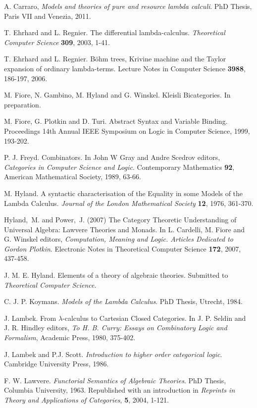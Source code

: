 \documentclass[12pt, amstex, amssymb]{article}
\begin{document}
\begin{thebibliography}{length}
A. Carraro, {\em Models and theories of pure and 
resource lambda calculi}.
PhD Thesis, Paris VII and Venezia, 2011.

T. Ehrhard and L. Regnier. The differential lambda-calculus.
{\em Theoretical Computer Science} {\bf 309}, 2003, 1-41.

T. Ehrhard and L. Regnier. B\"{o}hm trees, 
Krivine machine and the Taylor expansion of ordinary lambda-terms. 
Lecture Notes in Computer Science {\bf 3988}, 186-197, 2006. 


M. Fiore, N. Gambino, M. Hyland and G. Winskel.  Kleisli Bicategories.
In preparation.

M. Fiore, G. Plotkin and D. Turi.
Abstract Syntax and Variable Binding.
Proceedings 14th Annual IEEE Symposium on Logic in Computer Science,
1999, 193-202.

P. J. Freyd. Combinators. In
John W Gray and Andre Scedrov editors, {\it Categories in Computer Science
and Logic}. Contemporary Mathematics {\bf 92}, 
American Mathematical Society, 1989, 63-66.

M. Hyland. A syntactic characterisation of the Equality in some Models
of the Lambda Calculus. {\it Journal of the London Mathematical Society}
{\bf 12}, 1976, 361-370.


Hyland,~M. and Power,~J. (2007) 
The Category Theoretic Understanding of Universal 
Algebra: Lawvere Theories and Monads.
In L. Cardelli, M. Fiore and G. Winskel editors, 
{\it Computation, Meaning and Logic. Articles Dedicated to Gordon Plotkin}.
Electronic Notes in Theoretical Computer Science {\bf 172}, 2007, 437-458. 

J. M. E. Hyland. Elements of a theory of algebraic theories. 
Submitted to {\em Theoretical Computer Science}.

C. J. P. Koymans. {\em Models of the Lambda Calculus}. 
PhD Thesis, Utrecht, 1984.

J. Lambek. From $\lambda$-calculus to Cartesian Closed Categories.
In J. P. Seldin and J. R.  Hindley editors,
{\it To H. B. Curry: Essays on Combinatory Logic and Formalism},
Academic Press, 1980, 375-402. 

J. Lambek and P.J. Scott. 
{\em Introduction to higher order categorical logic}.
Cambridge University Press, 1986.


F. W. Lawvere. {\em Functorial Semantics of Algebraic Theories}.
PhD Thesis, Columbia University, 1963. Republished with an
introduction in {\it Reprints in Theory and Applications of Categories}, 
{\bf 5}, 2004, 1-121.



\end{thebibliography}
\end{document}
